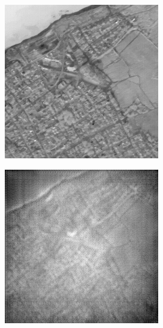 \documentclass[10pt,twocolumn,letterpaper]{article}
\begin{document}
\begin{figure}[!ht]
  \centering
  \begin{subfigure}[b]{0.19\textwidth}
      \centering
      \includegraphics[width=\textwidth]{../figs/outputs/pan/3.png}
  \end{subfigure}
  \hfill
  \begin{subfigure}[b]{0.19\textwidth}
      \centering
      \includegraphics[width=\textwidth]{../figs/outputs/cycleGan/3.png}

\end{subfigure}
\end{figure}
\end{document}
